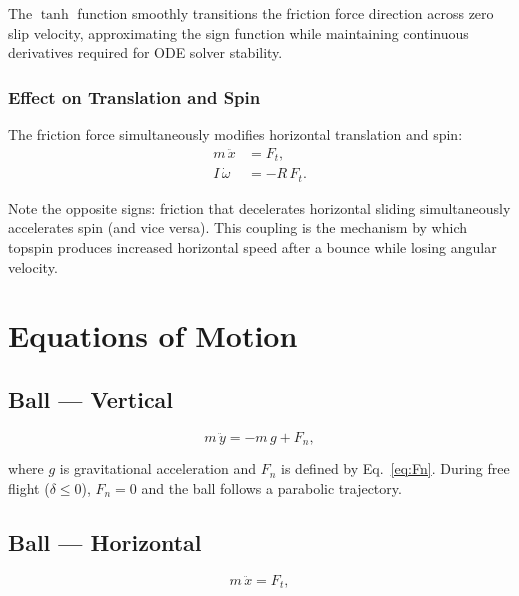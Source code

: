 \documentclass[11pt,a4paper]{article}
\begin{document}
The $\tanh$ function smoothly transitions the friction force direction across
zero slip velocity, approximating the sign function while maintaining
continuous derivatives required for ODE solver stability.

\subsubsection{Effect on Translation and Spin}

The friction force simultaneously modifies horizontal translation and spin:
\begin{align}
  m\,\ddot{x}    &= F_t,       \label{eq:xddot} \\
  I\,\dot{\omega} &= -R\,F_t.   \label{eq:omegadot}
\end{align}

Note the opposite signs: friction that decelerates horizontal sliding
simultaneously accelerates spin (and vice versa). This coupling is the
mechanism by which topspin produces increased horizontal speed after a bounce
while losing angular velocity.

\section{Equations of Motion}

\subsection{Ball --- Vertical}

\begin{equation}
  m\,\ddot{y} = -m\,g + F_n,
  \label{eq:ball_vert}
\end{equation}

where $g$ is gravitational acceleration and $F_n$ is defined by
Eq.~\eqref{eq:Fn}. During free flight ($\delta \leq 0$), $F_n = 0$ and the
ball follows a parabolic trajectory.

\subsection{Ball --- Horizontal}

\begin{equation}
  m\,\ddot{x} = F_t,
  \label{eq:ball_horiz}
\end{equation}
\end{document}
